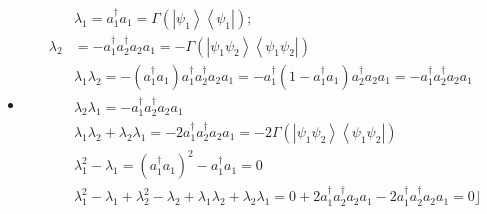 \documentclass[aps,preprint]{revtex4}%
\begin{document}
\begin{itemize}
$\lceil$ for example

\item
\begin{align}
&  \lambda_{1}=a_{1}^{\dagger}a_{1}=\Gamma\left(  \left\vert \psi
_{1}\right\rangle \left\langle \psi_{1}\right\vert \right)  ;\nonumber\\
\lambda_{2}  &  =-a_{1}^{\dagger}a_{2}^{\dagger}a_{2}a_{1}=-\Gamma\left(
\left\vert \psi_{1}\psi_{2}\right\rangle \left\langle \psi_{1}\psi
_{2}\right\vert \right) \nonumber\\
&  \lambda_{1}\lambda_{2}=-\left(  a_{1}^{\dagger}a_{1}\right)  a_{1}%
^{\dagger}a_{2}^{\dagger}a_{2}a_{1}=-a_{1}^{\dagger}\left(  1-a_{1}^{\dagger
}a_{1}\right)  a_{2}^{\dagger}a_{2}a_{1}=-a_{1}^{\dagger}a_{2}^{\dagger}%
a_{2}a_{1}\nonumber\\
&  \lambda_{2}\lambda_{1}=-a_{1}^{\dagger}a_{2}^{\dagger}a_{2}a_{1}\nonumber\\
&  \lambda_{1}\lambda_{2}+\lambda_{2}\lambda_{1}=-2a_{1}^{\dagger}%
a_{2}^{\dagger}a_{2}a_{1}=-2\Gamma\left(  \left\vert \psi_{1}\psi
_{2}\right\rangle \left\langle \psi_{1}\psi_{2}\right\vert \right) \nonumber\\
&  \lambda_{1}^{2}-\lambda_{1}=\left(  a_{1}^{\dagger}a_{1}\right)  ^{2}%
-a_{1}^{\dagger}a_{1}=0\nonumber\\
&  \lambda_{1}^{2}-\lambda_{1}+\lambda_{2}^{2}-\lambda_{2}+\lambda_{1}%
\lambda_{2}+\lambda_{2}\lambda_{1}=0+2a_{1}^{\dagger}a_{2}^{\dagger}a_{2}%
a_{1}-2a_{1}^{\dagger}a_{2}^{\dagger}a_{2}a_{1}=0\rfloor
\end{align}



\end{itemize}
\end{document}
